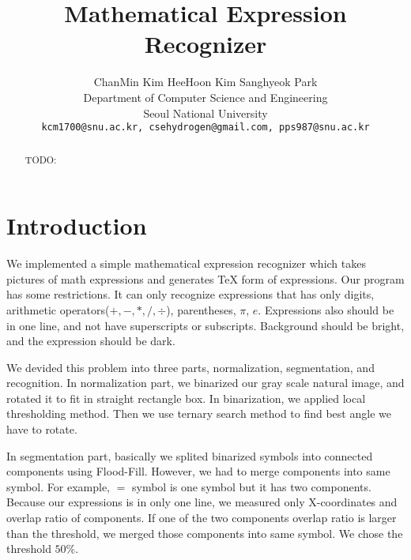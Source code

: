 \documentclass[10pt,twocolumn,letterpaper]{article}
\begin{document}
\title{Mathematical Expression Recognizer}

\author{ChanMin Kim \qquad HeeHoon Kim \qquad Sanghyeok Park\\
Department of Computer Science and Engineering\\
Seoul National University\\
{\tt\small kcm1700@snu.ac.kr, csehydrogen@gmail.com, pps987@snu.ac.kr}
}

\maketitle

\begin{abstract}
	TODO:
\end{abstract}

\section{Introduction}

We implemented a simple mathematical expression recognizer which takes pictures of
math expressions and generates TeX form of expressions. Our program has some restrictions.
It can only recognize expressions that has only digits, arithmetic operators($+, -, *, /, \div$),
parentheses, $\pi$, $e$. Expressions also should be in one line, and not have
superscripts or subscripts. Background should be bright, and the expression should be dark.

We devided this problem into three parts, normalization, segmentation, and recognition.
In normalization part, we binarized our gray scale natural image, and rotated it to
fit in straight rectangle box. In binarization, we applied local thresholding method.
Then we use ternary search method to find best angle we have to rotate.

In segmentation part, basically we splited binarized symbols into connected components
using Flood-Fill. However, we had to merge components into same symbol. For example,
$=$ symbol is one symbol but it has two components. Because our expressions is in only
one line, we measured only X-coordinates and overlap ratio of components. If one of the
two components overlap ratio is larger than the threshold, we merged those components
into same symbol. We chose the threshold $50\%$.
\end{document}
